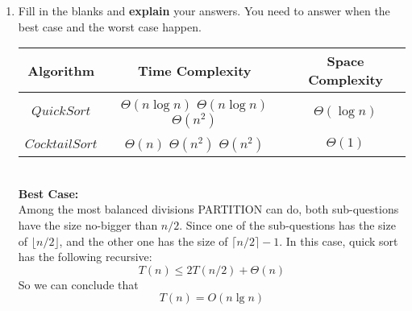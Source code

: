 \documentclass[12pt,a4paper]{article}
\theoremstyle{definition}
\begin{document}
\begin{enumerate}
\begin{minipage}[t]{0.45\textwidth}
\begin{algorithm}[H]
		$i\leftarrow i+1$\;
	}
\end{algorithm}
\end{minipage}

\begin{enumerate}
	 
\item Fill in the blanks and \textbf{explain} your answers. You need to answer when the best case and the worst case happen. 
\begin{table}[!h]

\label{Tab-compare}
	\centering
	\begin{threeparttable}
	\begin{tabular}{c|c| c }
		\toprule[2pt]
		\textbf{Algorithm} & \textbf{Time Complexity}\tnote{1} & \textbf{Space Complexity} \\
		\hline
		\hline
		$QuickSort$ & $\Theta\left(n\log n\right)$ $\Theta\left(n\log n\right)$ $\Theta\left(n^2\right)$ & $\Theta\left(\log n\right)$ \\

		$CocktailSort$ & $\Theta\left(n\right)$ $\Theta\left(n^2\right)$ $\Theta\left(n^2\right)$ & $\Theta\left(1\right)$  \\
		\bottomrule[2pt]


	\end{tabular}
	\end{threeparttable}
\end{table}

\vspace{1mm}\\

\textbf{Best Case:}\\
Among the most balanced divisions PARTITION can do, both sub-questions have the size no-bigger than $n/2$. Since one of the sub-questions has the size of $\lfloor n/2 \rfloor$, and the other one has the size of $\lceil n/2 \rceil-1$. In this case, quick sort has the following recursive: 
\begin{equation}
T\left(n\right) \leq 2T\left(n/2\right)+\Theta\left(n\right)
\end{equation}
So we can conclude that 
\begin{equation}
T\left(n\right) = O\left(n\lg n \right)
\end{equation}


\end{enumerate}
\end{enumerate}
\end{document}
